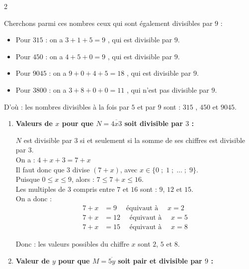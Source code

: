 \documentclass[10pt, a4paper]{article}
\begin{document}
\begin{multicols*}{2}
\begin{Solution}[APPLICATION][5]
\begin{enumerate}[leftmargin=*,itemsep=0.5pt]
    Cherchons parmi ces nombres ceux qui sont également divisibles par $9$ :
    \begin{itemize}[leftmargin=*,itemsep=0.5pt]
        \item Pour $315$ : on a $3+1+5 = 9$ , qui est divisible par $9$.
        \item Pour $450$ : on a $4+5+0 = 9$ , qui est divisible par $9$.
        \item Pour $9045$ : on a $9+0+4+5 = 18$ , qui est divisible par $9$.
        \item Pour $3800$ : on a $3+8+0+0 = 11$ , qui n'est pas divisible par $9$.
    \end{itemize}

   D'où : \quad les nombres divisibles à la fois par $5$ et par $9$ sont : $315$ , $450$ et $9045$.
\end{enumerate}
\end{Solution}

\begin{Solution}[APPLICATION][6]
\begin{enumerate}[leftmargin=*,itemsep=0.5pt]
    \item \textbf{Valeurs de $x$ pour que $N = \overline{4x3}$ soit divisible par $3$ :}

    $N$ est divisible par $3$ si et seulement si la somme de ses chiffres est divisible par $3$. \\
    On a : $4 + x + 3 = 7 + x$ \\
    Il faut donc que $3$ divise $(7 + x)$, avec $x \in \big\{0 \; ; \; 1 \; ; \; \ldots \; ; \; 9\big\}$. \\
    Puisque $0 \leq x \leq 9$, alors : $7 \leq 7 + x \leq 16$. \\
    Les multiples de $3$ compris entre $7$ et $16$ sont : $9$, $12$ et $15$. \\
    On a donc :
    \begin{align*}
        7 + x &= 9 \quad \text{ équivaut à } \quad x = 2 \\
        7 + x &= 12 \quad \text{ équivaut à } \quad x = 5 \\
        7 + x &= 15 \quad \text{ équivaut à } \quad x = 8
    \end{align*}

    Donc : \quad les valeurs possibles du chiffre $x$ sont $2$, $5$ et $8$.

    \item \textbf{Valeur de $y$ pour que $M = \overline{5y}$ soit pair et divisible par $9$ :}


\end{enumerate}
\end{Solution}
\end{multicols*}
\end{document}
